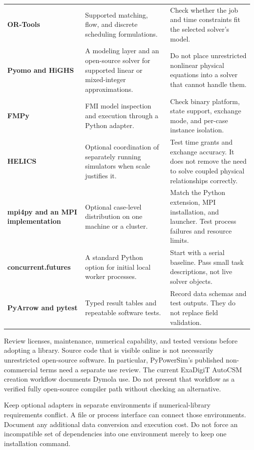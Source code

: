 \documentclass[11pt,a4paper]{report}
\begin{document}
\begin{longtable}{L{0.23\textwidth}L{0.32\textwidth}L{0.33\textwidth}}
\textbf{OR-Tools} & Supported matching, flow, and discrete scheduling formulations. & Check whether the job and time constraints fit the selected solver's model. \\
\textbf{Pyomo and HiGHS} & A modeling layer and an open-source solver for supported linear or mixed-integer approximations. & Do not place unrestricted nonlinear physical equations into a solver that cannot handle them. \\
\textbf{FMPy} & FMI model inspection and execution through a Python adapter. & Check binary platform, state support, exchange mode, and per-case instance isolation. \\
\textbf{HELICS} & Optional coordination of separately running simulators when scale justifies it. & Test time grants and exchange accuracy. It does not remove the need to solve coupled physical relationships correctly. \\
\textbf{mpi4py and an MPI implementation} & Optional case-level distribution on one machine or a cluster. & Match the Python extension, MPI installation, and launcher. Test process failures and resource limits. \\
\textbf{concurrent.futures} & A standard Python option for initial local worker processes. & Start with a serial baseline. Pass small task descriptions, not live solver objects. \\
\textbf{PyArrow and pytest} & Typed result tables and repeatable software tests. & Record data schemas and test outputs. They do not replace field validation. \\
\bottomrule
\end{longtable}

Review licenses, maintenance, numerical capability, and tested versions before adopting a library.
Source code that is visible online is not necessarily unrestricted open-source software.
In particular, PyPowerSim's published non-commercial terms need a separate use review.
The current ExaDigiT AutoCSM creation workflow documents Dymola use.
Do not present that workflow as a verified fully open-source compiler path without checking an alternative.

Keep optional adapters in separate environments if numerical-library requirements conflict.
A file or process interface can connect those environments.
Document any additional data conversion and execution cost.
Do not force an incompatible set of dependencies into one environment merely to keep one installation command.
\end{document}
